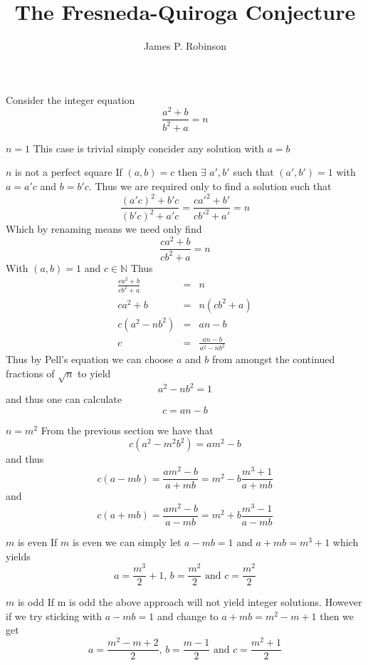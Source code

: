 \documentclass[a4paper,10pt]{article}
\title{The Fresneda-Quiroga Conjecture}
\author{James P. Robinson}
\begin{document}
\maketitle
Consider the integer equation $$\frac{a^2+b}{b^2+a}=n$$
\begin{section}{$n = 1$}
This case is trivial simply concider any solution with $a = b$
\end{section}
\begin{section}{$n$ is not a perfect square}
If $(a,b)=c$ then $\exists$ $a',b'$ such that $(a',b')=1$ with $a=a'c$ and $b=b'c$. Thus we are required only to find a solution such that $$\frac{(a'c)^2 + b'c}{(b'c)^2+a'c} = \frac{ca'^2+b'}{cb'^2+a'} = n$$ 
Which by renaming means we need only find  $$\frac{ca^2+b}{cb^2+a}=n$$ With $(a,b) = 1$ and $c\in\mathbb{N}$
Thus 
\begin{eqnarray*}
  \frac{ca^2+b}{cb^2+a}&=&n\\
  ca^2+b&=&n(cb^2+a)\\
  c(a^2-nb^2)&=&an-b\\
  c&=&\frac{an-b}{a^2-nb^2}
\end{eqnarray*}
Thus by Pell's equation we can choose $a$ and $b$ from amongst the continued fractions of $\sqrt{n}$ to yield $$a^2-nb^2=1$$ and thus one can calculate $$c=an-b$$ 
\end{section}
\begin{section}{$n=m^2$}
From the previous section we have that $$c(a^2-m^2b^2)=am^2-b$$
and thus $$c(a-mb)=\frac{am^2-b}{a+mb}=m^2-b\frac{m^3+1}{a+mb}$$
and $$c(a+mb)=\frac{am^2-b}{a-mb}=m^2+b\frac{m^3-1}{a-mb}$$
\begin{subsection}{$m$ is even}
  If $m$ is even we can simply let $a-mb=1$ and $a+mb=m^3+1$ which yields
$$a=\frac{m^3}2+1\textrm{, }b=\frac{m^2}2\textrm{ and }c = \frac{m^2}2$$
\end{subsection}
\begin{subsection}{$m$ is odd}
  If m is odd the above approach will not yield integer solutions. However if we try sticking with $a-mb = 1$ and change to $a+mb=m^2-m+1$ then we get
  $$a=\frac{m^2-m+2}2\textrm{, }b=\frac{m-1}2\textrm{ and }c=\frac{m^2+1}2$$
\end{subsection}
\end{section}
\end{document}
